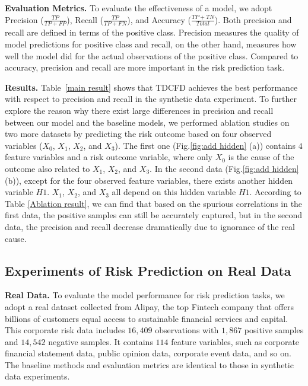 \documentclass[letterpaper]{article} %
\theoremstyle{definition}
\theoremstyle{remark}
\begin{document}
\noindent\textbf{Evaluation Metrics.}
To evaluate the effectiveness of a model, we adopt Precision ($\frac{TP}{TP+FP}$), Recall ($\frac{TP}{TP+FN}$), and Accuracy ($\frac{TP+TN}{Total}$). Both precision and recall are defined in terms of the positive class. Precision measures the quality of model predictions for positive class and recall, on the other hand, measures how well the model did for the actual observations of the positive class. Compared to accuracy, precision and recall are more important in the risk prediction task.


\noindent\textbf{Results.}
Table~\ref{main result} shows that TDCFD achieves the best performance with respect to precision and recall in the synthetic data experiment. To further explore the reason why there exist large differences in precision and recall between our model and the baseline models, we performed ablation studies on two more datasets by predicting the risk outcome based on four observed variables ($X_0$, $X_1$, $X_2$, and $X_3$). The first one (Fig.\ref{fig:add hidden} (a)) contains $4$ feature variables and a risk outcome variable, where only $X_0$ is the cause of the outcome also related to $X_1$, $X_2$, and $X_3$. In the second data (Fig.\ref{fig:add hidden} (b)), except for the four observed feature variables, there exists another hidden variable $H1$. $X_1$, $X_2$, and $X_3$ all depend on this hidden variable $H1$. According to Table \ref{Ablation result}, we can find that based on the spurious correlations in the first data, the positive samples can still be accurately captured, but in the second data, the precision and recall decrease dramatically due to ignorance of the real cause.

\subsection{Experiments of Risk Prediction on Real Data}


\noindent\textbf{Real Data.}
To evaluate the model performance for risk prediction tasks, we adopt a real dataset collected from Alipay, the top Fintech company that offers billions of customers equal access to sustainable financial services and capital. This corporate risk data includes $16,409$ observations with $1,867$ positive samples and $14,542$ negative samples. It contains $114$ feature variables, such as corporate financial statement data, public opinion data, corporate event data, and so on. The baseline methods and evaluation metrics are identical to those in synthetic data experiments.
\end{document}
